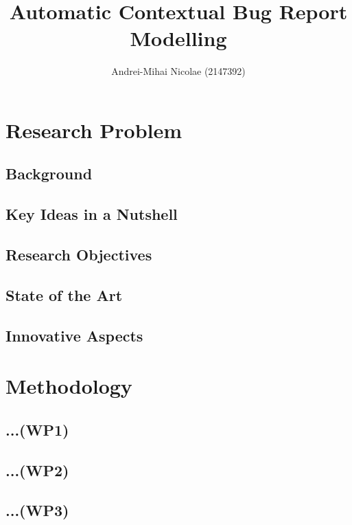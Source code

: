 \documentclass[11pt,english,twocolumn]{article}
\begin{document}
\title{Automatic Contextual Bug Report Modelling}

\author{Andrei-Mihai Nicolae (2147392)}
\date{}
\maketitle

\section{Research Problem}

\subsection{Background}


\subsection{Key Ideas in a Nutshell}

\subsection{Research Objectives}

\subsection{State of the Art}

\subsection{Innovative Aspects}

\section{Methodology}

\subsection{...(WP1)}

\subsection{...(WP2)}

\subsection{...(WP3)}
\end{document}
